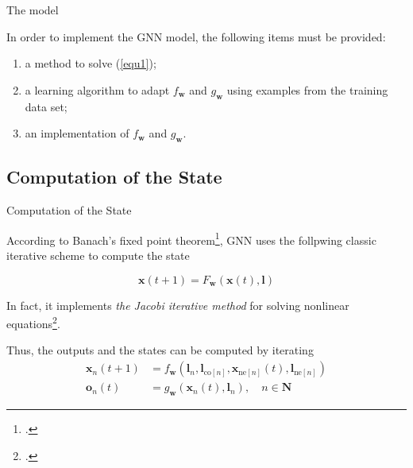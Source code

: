 \documentclass[10pt,aspectratio=169]{beamer}
\begin{document}
\begin{frame}[allowframebreaks]{The model}
\framebreak

In order to implement the GNN model, the following items must be provided:

\begin{enumerate}
    \item a method to solve (\ref{equ1});
    \item a learning algorithm to adapt $f_{\boldsymbol{w}}$ and $g_{\boldsymbol{w}}$ using examples from the training data set;
    \item an implementation of $f_{\boldsymbol{w}}$ and $g_{\boldsymbol{w}}$.
\end{enumerate}

\end{frame}

\subsection{Computation of the State}
\begin{frame}[allowframebreaks]{Computation of the State}

According to Banach’s fixed point theorem\footcite{khamsi2011introduction}, GNN uses the follpwing classic iterative scheme to compute the state

\begin{equation}
    \boldsymbol{x}(t + 1) = F_{\boldsymbol{w}} (\boldsymbol{x}(t), \boldsymbol{l})     
\end{equation}

In fact, it implements \emph{the Jacobi iterative method} for solving nonlinear equations\footcites{powell1964efficient}.

Thus, the outputs and the states can be computed by iterating
\begin{equation}
    \label{equ5}
    \begin{aligned}
        \boldsymbol{x}_{n}(t+1) &=f_{\boldsymbol{w}}\left(\boldsymbol{l}_{n}, \boldsymbol{l}_{\mathrm{co}[n]}, \boldsymbol{x}_{\mathrm{ne}[n]}(t), \boldsymbol{l}_{\mathrm{ne}[n]}\right) \\
        \boldsymbol{o}_{n}(t) &=g_{\boldsymbol{w}}\left(\boldsymbol{x}_{n}(t), \boldsymbol{l}_{n}\right), \quad n \in \boldsymbol{N}
    \end{aligned}        
\end{equation}
\end{frame}
\end{document}
